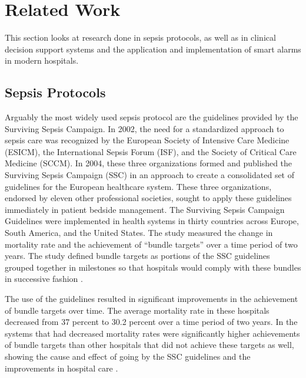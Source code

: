 \documentclass{sig-alternate}
\begin{document}
\vspace{10pt}
\section{Related Work}
\vspace{10pt}
\label{sec:related_work}

This section looks at research done in sepsis protocols, as well as in clinical decision support systems and the application and implementation of smart alarms in modern hospitals.

\vspace{10pt}
\subsection{Sepsis Protocols}
\label{subsec:protocols}
\vspace{10pt}

Arguably the most widely used sepsis protocol are the guidelines provided by the Surviving Sepsis Campaign. In 2002, the need for a standardized approach to sepsis care was recognized by the European Society of Intensive Care Medicine (ESICM), the International Sepsis Forum (ISF), and the Society of Critical Care Medicine (SCCM). In 2004, these three organizations formed and published the Surviving Sepsis Campaign (SSC) in an approach to create a consolidated set of guidelines for the European healthcare system. These three organizations, endorsed by eleven other professional societies, sought to apply these guidelines immediately in patient bedside management. The Surviving Sepsis Campaign Guidelines were implemented in health systems in thirty countries across Europe, South America, and the United States. The study measured the change in mortality rate and the achievement of ``bundle targets'' over a time period of two years. The study defined bundle targets as portions of the SSC guidelines grouped together in milestones so that hospitals would comply with these bundles in successive fashion \cite{ssc}. 

The use of the guidelines resulted in significant improvements in the achievement of bundle targets over time. The average mortality rate in these hospitals decreased from 37 percent to 30.2 percent over a time period of two years. In the systems that had decreased mortality rates were significantly higher achievements of bundle targets than other hospitals that did not achieve these targets as well, showing the cause and effect of going by the SSC guidelines and the improvements in hospital care \cite{ssc}.
\end{document}
